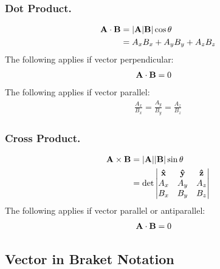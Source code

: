 \documentclass[../main.tex]{subfiles}
\begin{document}
\subsubsection*{Dot Product.}
\begin{align*}
	\mathbf{A}\cdot\mathbf{B} & =|\mathbf{A}|\mathbf{B}|\cos\theta    \\
	          & =A_xB_x+A_yB_y+A_zB_z
\end{align*}
The following applies if vector perpendicular:
\begin{align*}
	\mathbf{A}\cdot\mathbf{B} & =0
\end{align*}
The following applies if vector parallel:
\begin{align*}
	\frac{A_x}{B_x}=\frac{A_y}{B_y}=\frac{A_z}{B_z}
\end{align*}

\subsubsection*{Cross Product.}
\begin{align*}
	\mathbf{A}\times\mathbf{B} & =|\mathbf{A}||\mathbf{B}|\sin\theta  \\
	           & =\det\begin{vmatrix}
		                  \mathbf{\hat{x}}  & \mathbf{\hat{y}}  & \mathbf{\hat{z}}  \\
		                  A_x & A_y & A_z \\
		                  B_x & B_y & B_z
	                  \end{vmatrix}
\end{align*}
The following applies if vector parallel or antiparallel:
\begin{align*}
	\mathbf{A}\cdot\mathbf{B} & =0
\end{align*}

\subsection*{Vector in Braket Notation}
\end{document}
